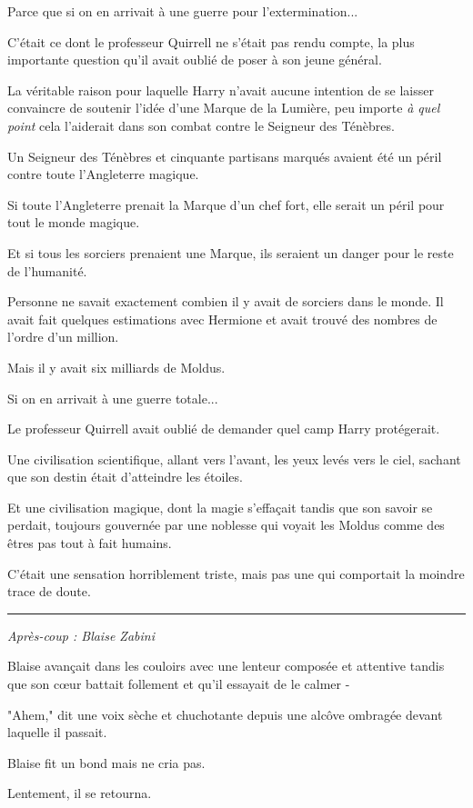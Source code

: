 Parce que si on en arrivait à une guerre pour l'extermination...

C'était ce dont le professeur Quirrell ne s'était pas rendu compte, la plus importante question qu'il avait oublié de poser à son jeune général.

La véritable raison pour laquelle Harry n'avait aucune intention de se laisser convaincre de soutenir l'idée d'une Marque de la Lumière, peu importe \emph{à quel point}  cela l'aiderait dans son combat contre le Seigneur des Ténèbres.

Un Seigneur des Ténèbres et cinquante partisans marqués avaient été un péril contre toute l'Angleterre magique.

Si toute l'Angleterre prenait la Marque d'un chef fort, elle serait un péril pour tout le monde magique.

Et si tous les sorciers prenaient une Marque, ils seraient un danger pour le reste de l'humanité.

Personne ne savait exactement combien il y avait de sorciers dans le monde. Il avait fait quelques estimations avec Hermione et avait trouvé des nombres de l'ordre d'un million.

Mais il y avait six milliards de Moldus.

Si on en arrivait à une guerre totale...

Le professeur Quirrell avait oublié de demander quel camp Harry protégerait.

Une civilisation scientifique, allant vers l'avant, les yeux levés vers le ciel, sachant que son destin était d'atteindre les étoiles.

Et une civilisation magique, dont la magie s'effaçait tandis que son savoir se perdait, toujours gouvernée par une noblesse qui voyait les Moldus comme des êtres pas tout à fait humains.

C'était une sensation horriblement triste, mais pas une qui comportait la moindre trace de doute.
\par\noindent\rule{\textwidth}{0.4pt}
\emph{Après-coup : Blaise Zabini} 

Blaise avançait dans les couloirs avec une lenteur composée et attentive tandis que son cœur battait follement et qu'il essayait de le calmer -

"Ahem," dit une voix sèche et chuchotante depuis une alcôve ombragée devant laquelle il passait.

Blaise fit un bond mais ne cria pas.

Lentement, il se retourna.

